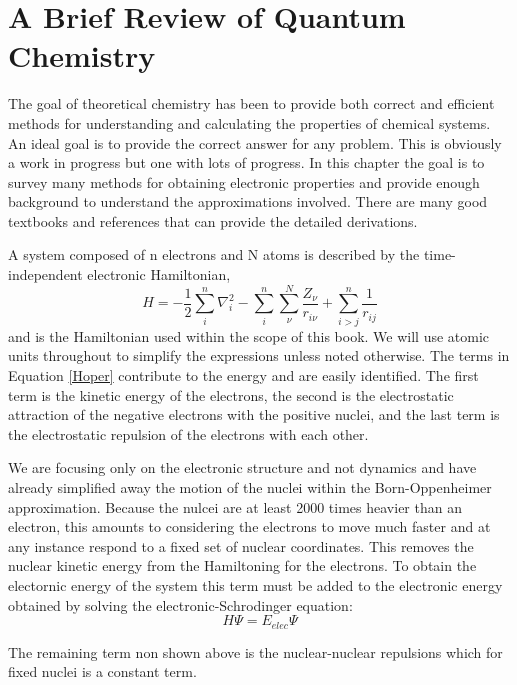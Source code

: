 \chapter{A Brief Review of Quantum Chemistry}

The goal of theoretical chemistry has been to provide both correct and efficient methods for understanding and calculating the properties of chemical systems. An ideal goal is to provide the correct answer for any problem.  This is obviously a work in progress but one with lots of progress.  In this chapter the goal is to survey many methods for obtaining electronic properties and provide enough background to understand the approximations involved.  There are many good textbooks and references that can provide the detailed derivations.\cite{SzaboOstland,Atkins,ShavBart}


A system composed of n electrons and N atoms is described by the time-independent electronic Hamiltonian,
\begin{equation}
H = -\frac{1}{2}\sum_i^n{\nabla^2_i} - \sum_i^n\sum_\nu^N{\frac{Z_\nu}{r_{i\nu}}} + \sum_{i>j}^n{\frac{1}{r_{ij}}} 
\label{Hoper}
\end{equation}
and is the Hamiltonian used within the scope of this book. We will use atomic units\cite{auref} throughout to simplify the expressions unless noted otherwise. The terms in Equation \ref{Hoper} contribute to the energy and are easily identified. The first term is the kinetic energy of the electrons, the second is the electrostatic attraction of the negative electrons with the positive nuclei, and the last term is the electrostatic repulsion of the electrons with each other.

We are focusing only on the electronic structure and not dynamics and have already simplified away the motion of the nuclei within the Born-Oppenheimer approximation\cite{BOref}.  Because the nulcei are at least 2000 times heavier than an electron, this amounts to considering the electrons to move much faster and at any instance respond to a fixed set of nuclear coordinates.  This removes the nuclear kinetic energy from the Hamiltoning for the electrons.  To obtain the electornic energy of the system this term must be added to the electronic energy obtained by solving the electronic-Schrodinger equation: 
\begin{equation}
H\Psi = E_{elec}\Psi
\end{equation}  
 

The remaining term non shown above is the nuclear-nuclear repulsions which for fixed nuclei is a constant term.  

